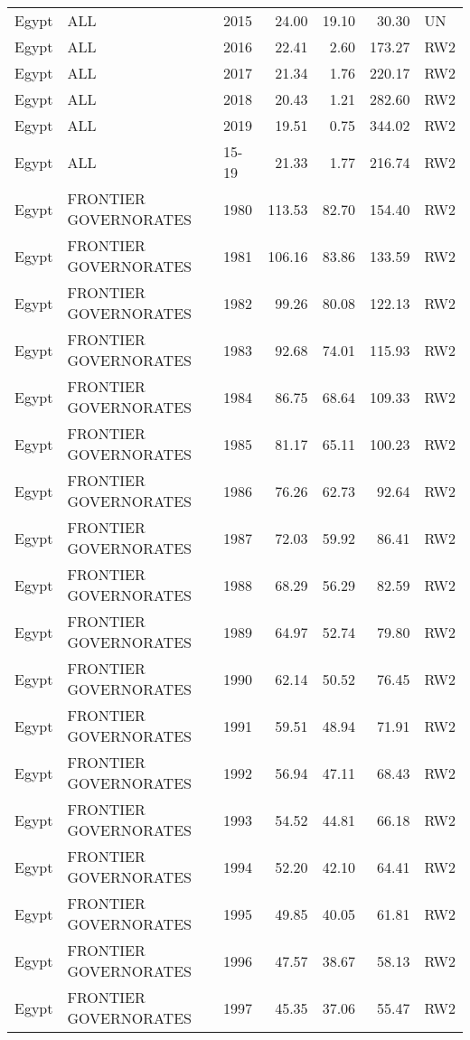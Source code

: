 \begin{longtable}{lllrrrl}
  Egypt & ALL & 2015 & 24.00 & 19.10 & 30.30 & UN \\ 
  Egypt & ALL & 2016 & 22.41 & 2.60 & 173.27 & RW2 \\ 
  Egypt & ALL & 2017 & 21.34 & 1.76 & 220.17 & RW2 \\ 
  Egypt & ALL & 2018 & 20.43 & 1.21 & 282.60 & RW2 \\ 
  Egypt & ALL & 2019 & 19.51 & 0.75 & 344.02 & RW2 \\ 
  Egypt & ALL & 15-19 & 21.33 & 1.77 & 216.74 & RW2 \\ 
  Egypt & FRONTIER GOVERNORATES & 1980 & 113.53 & 82.70 & 154.40 & RW2 \\ 
  Egypt & FRONTIER GOVERNORATES & 1981 & 106.16 & 83.86 & 133.59 & RW2 \\ 
  Egypt & FRONTIER GOVERNORATES & 1982 & 99.26 & 80.08 & 122.13 & RW2 \\ 
  Egypt & FRONTIER GOVERNORATES & 1983 & 92.68 & 74.01 & 115.93 & RW2 \\ 
  Egypt & FRONTIER GOVERNORATES & 1984 & 86.75 & 68.64 & 109.33 & RW2 \\ 
  Egypt & FRONTIER GOVERNORATES & 1985 & 81.17 & 65.11 & 100.23 & RW2 \\ 
  Egypt & FRONTIER GOVERNORATES & 1986 & 76.26 & 62.73 & 92.64 & RW2 \\ 
  Egypt & FRONTIER GOVERNORATES & 1987 & 72.03 & 59.92 & 86.41 & RW2 \\ 
  Egypt & FRONTIER GOVERNORATES & 1988 & 68.29 & 56.29 & 82.59 & RW2 \\ 
  Egypt & FRONTIER GOVERNORATES & 1989 & 64.97 & 52.74 & 79.80 & RW2 \\ 
  Egypt & FRONTIER GOVERNORATES & 1990 & 62.14 & 50.52 & 76.45 & RW2 \\ 
  Egypt & FRONTIER GOVERNORATES & 1991 & 59.51 & 48.94 & 71.91 & RW2 \\ 
  Egypt & FRONTIER GOVERNORATES & 1992 & 56.94 & 47.11 & 68.43 & RW2 \\ 
  Egypt & FRONTIER GOVERNORATES & 1993 & 54.52 & 44.81 & 66.18 & RW2 \\ 
  Egypt & FRONTIER GOVERNORATES & 1994 & 52.20 & 42.10 & 64.41 & RW2 \\ 
  Egypt & FRONTIER GOVERNORATES & 1995 & 49.85 & 40.05 & 61.81 & RW2 \\ 
  Egypt & FRONTIER GOVERNORATES & 1996 & 47.57 & 38.67 & 58.13 & RW2 \\ 
  Egypt & FRONTIER GOVERNORATES & 1997 & 45.35 & 37.06 & 55.47 & RW2 \\ 

\end{longtable}
